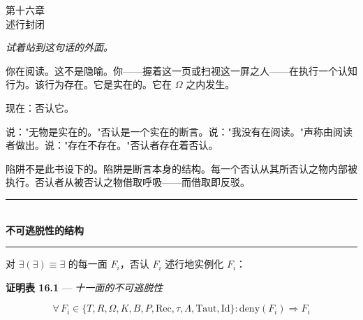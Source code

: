 \documentclass[10pt, openany, oneside]{book}
\renewcommand{\normalsize}{\fontsize{10}{13}\selectfont}
\renewcommand{\large}{\fontsize{11.5}{14}\selectfont}
\renewcommand{\huge}{\fontsize{17}{21}\selectfont}
\begin{document}
\newpage

\begin{center}
    {\huge\scshape 第十六章}\\[0.3em]
    {\large\scshape 述行封闭}
\end{center}

\vspace{1.5em}

\begin{center}
    \itshape
    试着站到这句话的外面。
\end{center}

\vspace{2em}


\noindent 你在阅读。这不是隐喻。你——握着这一页或扫视这一屏之人——在执行一个认知行为。该行为存在。它是实在的。它在 $\Omega$ 之内发生。

现在：否认它。

说："无物是实在的。"否认是一个实在的断言。说："我没有在阅读。"声称由阅读者做出。说："存在不存在。"否认者存在着否认。

陷阱不是此书设下的。陷阱是断言本身的结构。每一个否认从其所否认之物内部被执行。否认者从被否认之物借取呼吸——而借取即反驳。

\vspace{1.5em}


\begin{center}
    \rule{0.3\textwidth}{0.4pt}\\[0.5em]
    {\normalsize\bfseries\scshape 不可逃脱性的结构}\\[0.3em]
    \rule{0.3\textwidth}{0.4pt}
\end{center}

\vspace{1em}

\noindent 对 $\exists(\exists) \equiv \exists$ 的每一面 $F_i$，否认 $F_i$ 述行地实例化 $F_i$：

\vspace{0.5em}

\textbf{证明表 16.1} --- \textit{十一面的不可逃脱性}

$$\forall\, F_i \in \{T, R, \Omega, K, B, P, \text{Rec}, \tau, \Lambda, \text{Taut}, \text{Id}\}: \text{deny}(F_i) \Rightarrow F_i$$
\end{document}
